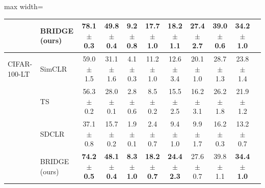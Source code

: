 \begin{table}[t]
\begin{adjustbox}{max width=\textwidth}
\begin{tabular}{l l c c c c c c c c c}
\rowcolor{blue!10}  & BRIDGE (ours) & 78.1 {\scriptsize$\pm$ 0.3} & \textbf{49.8 {\scriptsize$\pm$ 0.4}} & \textbf{9.2 {\scriptsize$\pm$ 0.8}} & \textbf{17.7 {\scriptsize$\pm$ 1.0}} & 18.2 {\scriptsize$\pm$ 1.1} & \textbf{27.4 {\scriptsize$\pm$ 2.7}} & 39.0 {\scriptsize$\pm$ 0.6} & \textbf{34.2 {\scriptsize$\pm$ 1.0}} \\
\midrule
CIFAR-100-LT & SimCLR & 59.0 {\scriptsize$\pm$ 1.5} & 31.1 {\scriptsize$\pm$ 1.6} & 4.1 {\scriptsize$\pm$ 0.3} & 11.2 {\scriptsize$\pm$ 1.0} & 12.6 {\scriptsize$\pm$ 3.4} & 20.1 {\scriptsize$\pm$ 1.0} & 28.7 {\scriptsize$\pm$ 1.3} & 23.8 {\scriptsize$\pm$ 1.4} \\
 & TS & 56.3 {\scriptsize$\pm$ 0.2} & 28.0 {\scriptsize$\pm$ 0.1} & 2.8 {\scriptsize$\pm$ 0.6} & 8.5 {\scriptsize$\pm$ 0.2} & 15.5 {\scriptsize$\pm$ 2.5} & 16.2 {\scriptsize$\pm$ 3.1} & 26.2 {\scriptsize$\pm$ 1.8} & 21.9 {\scriptsize$\pm$ 1.2} \\
 & SDCLR & 37.1 {\scriptsize$\pm$ 0.8} & 15.7 {\scriptsize$\pm$ 0.2} & 1.9 {\scriptsize$\pm$ 0.1} & 2.4 {\scriptsize$\pm$ 0.7} & 9.4 {\scriptsize$\pm$ 1.0} & 9.9 {\scriptsize$\pm$ 1.7} & 16.2 {\scriptsize$\pm$ 0.3} & 13.2 {\scriptsize$\pm$ 0.7} \\
\rowcolor{blue!10}  & BRIDGE (ours) & \textbf{74.2 {\scriptsize$\pm$ 0.5}} & \textbf{48.1 {\scriptsize$\pm$ 0.4}} & \textbf{8.3 {\scriptsize$\pm$ 1.0}} & \textbf{18.2 {\scriptsize$\pm$ 0.7}} & \textbf{24.4 {\scriptsize$\pm$ 2.3}} & 27.6 {\scriptsize$\pm$ 0.7} & 39.8 {\scriptsize$\pm$ 1.1} & \textbf{34.4 {\scriptsize$\pm$ 1.0}} \\
\bottomrule
\end{tabular}
\end{adjustbox}
\end{table}
